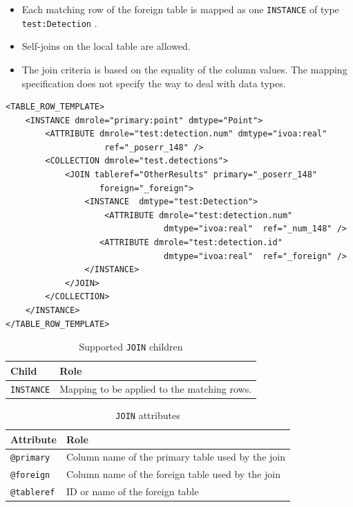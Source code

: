 \documentclass[11pt,a4paper]{ivoa}
\begin{document}
\begin{itemize}
    \item Each matching row of the foreign table is mapped as  one \texttt{INSTANCE} of type \texttt{test:Detection} .
    \item Self-joins  on the local table are allowed.
    \item The join criteria is based on the equality of the column values. 
             The mapping specification does not specify the way to deal with data types.
\end{itemize}

\begin{lstlisting}[caption={JOIN example},style=XML]
<TABLE_ROW_TEMPLATE>
    <INSTANCE dmrole="primary:point" dmtype="Point">
        <ATTRIBUTE dmrole="test:detection.num" dmtype="ivoa:real"
                    ref="_poserr_148" />
        <COLLECTION dmrole="test.detections">
            <JOIN tableref="OtherResults" primary="_poserr_148"
                   foreign="_foreign">
                <INSTANCE  dmtype="test:Detection">
                    <ATTRIBUTE dmrole="test:detection.num" 
                                dmtype="ivoa:real"  ref="_num_148" />
                   <ATTRIBUTE dmrole="test:detection.id" 
                                dmtype="ivoa:real"  ref="_foreign" />
                </INSTANCE>
            </JOIN>
        </COLLECTION>
    </INSTANCE>
</TABLE_ROW_TEMPLATE>
\end{lstlisting}


\begin{table}[hbtp]
\small
\centering
\begin{tabulary}{\linewidth}{|L|J|}
\hline
    \textbf{Child} &
    \textbf{Role} \\
\hline \hline
     \texttt{INSTANCE}    &
     Mapping to be applied to the matching rows.  \\       
\hline
\end{tabulary}
     \caption{Supported  \texttt{JOIN} children} 
     \label{tbl:join-children}
\end{table}

\begin{table}[!htbp]
\small
\centering
\begin{tabulary}{\linewidth}{|L|J|}
       \hline
           \textbf{Attribute} &  
           \textbf{Role} \\
       \hline  \hline
           \texttt{@primary}    & 
           Column name of the primary table used  by the join \\       
       \hline  
           \texttt{@foreign}    & 
           Column name of the foreign table used  by the join \\       
      \hline  
           \texttt{@tableref}    & 
           ID or name of the foreign table \\       
       \hline 
\end{tabulary}
\caption{\texttt{JOIN} attributes} 
\label{tbl:join-att}
\end{table}
\end{document}
